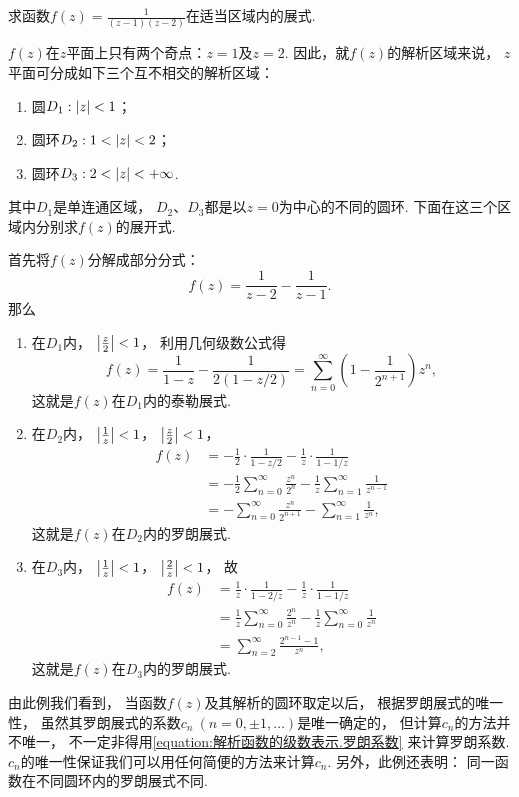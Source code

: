 \begin{example}
求函数\(f(z) = \frac{1}{(z-1)(z-2)}\)在适当区域内的展式.
\begin{solution}
\(f(z)\)在\(z\)平面上只有两个奇点：\(z=1\)及\(z=2\).
因此，就\(f(z)\)的解析区域来说，
\(z\)平面可分成如下三个互不相交的解析区域：
\begin{enumerate}
	\item 圆\(D_1: \abs{z}<1\)；
	\item 圆环\(D_2: 1<\abs{z}<2\)；
	\item 圆环\(D_3: 2<\abs{z}<+\infty\).
\end{enumerate}
其中\(D_1\)是单连通区域，
\(D_2\)、\(D_3\)都是以\(z=0\)为中心的不同的圆环.
下面在这三个区域内分别求\(f(z)\)的展开式.

首先将\(f(z)\)分解成部分分式：\[
	f(z) = \frac{1}{z-2} - \frac{1}{z-1}.
\]
那么\begin{enumerate}
	\item 在\(D_1\)内，
	\(\abs{\frac{z}{2}}<1\)，
	利用几何级数公式得\[
		f(z) = \frac{1}{1-z} - \frac{1}{2 (1-z/2)}
		= \sum_{n=0}^\infty \left(1 - \frac{1}{2^{n+1}}\right) z^n,
	\]
	这就是\(f(z)\)在\(D_1\)内的泰勒展式.

	\item 在\(D_2\)内，
	\(\abs{\frac{1}{z}}<1\)，
	\(\abs{\frac{z}{2}}<1\)，
	\begin{align*}
		f(z) &= -\frac{1}{2}\cdot\frac{1}{1-z/2}
			- \frac{1}{z}\cdot\frac{1}{1-1/z} \\
		&= -\frac{1}{2} \sum_{n=0}^\infty \frac{z^n}{2^n}
			- \frac{1}{z} \sum_{n=1}^\infty \frac{1}{z^{n-1}} \\
		&= -\sum_{n=0}^\infty \frac{z^n}{2^{n+1}}
			- \sum_{n=1}^\infty \frac{1}{z^n},
	\end{align*}
	这就是\(f(z)\)在\(D_2\)内的罗朗展式.

	\item 在\(D_3\)内，
	\(\abs{\frac{1}{z}}<1\)，
	\(\abs{\frac{2}{z}}<1\)，
	故\begin{align*}
		f(z) &= \frac{1}{z}\cdot\frac{1}{1-2/z}
			- \frac{1}{z}\cdot\frac{1}{1-1/z} \\
		&= \frac{1}{z} \sum_{n=0}^\infty \frac{2^n}{z^n}
			- \frac{1}{z} \sum_{n=0}^\infty \frac{1}{z^n} \\
		&= \sum_{n=2}^\infty \frac{2^{n-1}-1}{z^n},
	\end{align*}
	这就是\(f(z)\)在\(D_3\)内的罗朗展式.
\end{enumerate}
\end{solution}
由此例我们看到，
当函数\(f(z)\)及其解析的圆环取定以后，
根据罗朗展式的唯一性，
虽然其罗朗展式的系数\(c_n\ (n=0,\pm1,\dotsc)\)是唯一确定的，
但计算\(c_n\)的方法并不唯一，
不一定非得用\cref{equation:解析函数的级数表示.罗朗系数} 来计算罗朗系数.
\(c_n\)的唯一性保证我们可以用任何简便的方法来计算\(c_n\).
另外，此例还表明：
同一函数在不同圆环内的罗朗展式不同.
\end{example}

